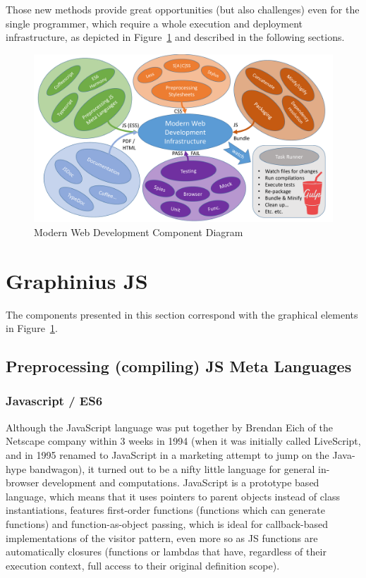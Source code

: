 Those new methods provide great opportunities (but also challenges) even for the single programmer, which require a whole execution and deployment infrastructure, as depicted in Figure~\ref{fig:webdev_cycle_components} and described in the following sections.

\begin{landscape}
\begin{figure}[ht]
	\centering
	\hspace*{-1cm}
	\vspace*{1cm}
	\includegraphics[width=1.8\textwidth]{figures/Modern_Web_Dev}
	\caption{Modern Web Development Component Diagram}
	\label{fig:webdev_cycle_components}
\end{figure}
\end{landscape}


\section{Graphinius JS}
\label{library}

	The components presented in this section correspond with the graphical elements in Figure~\ref{fig:webdev_cycle_components}.

	\subsection{Preprocessing (compiling) JS Meta Languages}
	\label{ssect:language}
	
		\subsubsection{Javascript / ES6}
		\label{sssect:js_es6}
		
		Although the JavaScript language was put together by Brendan Eich of the Netscape company within 3 weeks in 1994 (when it was initially called LiveScript, and in 1995 renamed to JavaScript in a marketing attempt to jump on the Java-hype bandwagon), it turned out to be a nifty little language for general in-browser development and computations. JavaScript is a prototype based language, which means that it uses pointers to parent objects instead of class instantiations, features first-order functions (functions which can generate functions) and function-as-object passing, which is ideal for callback-based implementations of the visitor pattern, even more so as JS functions are automatically closures (functions or lambdas that have, regardless of their execution context, full access to their original definition scope).
		

